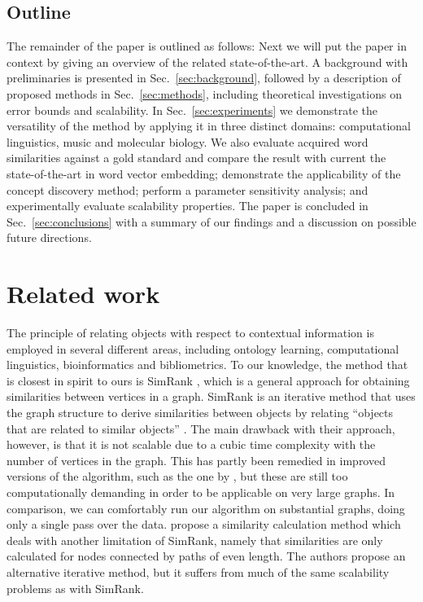 \documentclass{kais}
\begin{document}
\subsection{Outline}
The remainder of the paper is outlined as follows: Next we will put the paper in context by giving an overview of the related
state-of-the-art. A background with preliminaries is presented in Sec.\ \ref{sec:background}, followed by a description of
proposed methods in Sec.\ \ref{sec:methods}, including theoretical investigations on error bounds and scalability. 
In Sec.\ \ref{sec:experiments} we demonstrate the versatility of the method by
applying it in three distinct domains: computational linguistics, music and molecular biology. We also evaluate acquired
word similarities against a gold standard and compare the result with current the state-of-the-art in word vector embedding;
demonstrate the applicability of the concept discovery method; perform a parameter sensitivity analysis; and 
experimentally evaluate scalability properties. The paper is concluded in Sec.\ \ref{sec:conclusions} with a summary of our findings 
and a discussion on possible future directions.

\section{Related work}
\label{sec:related work}

The principle of relating objects with respect to contextual information is employed in several different areas, including ontology
learning, computational linguistics, bioinformatics and bibliometrics. To our knowledge, the method that is closest in spirit to
ours is SimRank \cite{Jeh2002simrank}, which is a general approach for obtaining similarities between vertices in a graph.
SimRank is an iterative method that uses the graph structure to derive similarities between objects by relating ``objects that are
related to similar objects'' \cite{Jeh2002simrank}. The main drawback with their approach, however, is that it is not scalable due to
a cubic time complexity with the number of vertices in the graph. This has partly been remedied in improved versions of the algorithm,
such as the one by , but these are still too computationally demanding in order to be applicable on
very large graphs. In comparison, we can comfortably run our algorithm on substantial graphs, doing only a single
pass over the data.
 propose a similarity calculation method which deals with another
limitation of SimRank, namely that similarities are only calculated for nodes connected by paths of
even length. The authors propose an alternative iterative method, but it suffers from much of the same scalability
problems as with SimRank.
\end{document}
